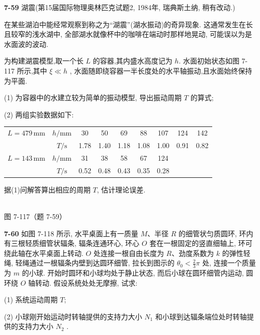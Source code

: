 \newpage

\textbf{7-59} 湖震(第15届国际物理奥林匹克试题2, 1984年, 瑞典斯土纳, 稍有改动.)

在某些湖泊中能经常观察到称之为“湖震”(湖水振动)的奇异现象. 这通常发生在长且较窄的浅水湖中, 全部湖水就像杯中的咖啡在端动时那样地晃动, 可能误以为是水面波的波动.

为构建湖震模型,取一个长 $L$ 的容器,其内盛水高度记为 $h$. 水面初始状态如图 7-117 所示,其中 $\xi \ll h$ , 水面随即绕容器一半长度处的水平轴振动,且水面始终保持为平面.

(1) 为容器中的水建立较为简单的振动模型, 导出振动周期 $T$ 的算式;

(2) 两组实验数据如下:

\begin{center}
\begin{tabular}{c|cccccccc}
\hline
$L=479\,\mathrm{mm}$ & $h/\text{mm}$ & 30 & 50 & 69 & 88 & 107 & 124 & 142\\
 & $T/\text{s}$ & 1.78 & 1.40 & 1.18 & 1.08 & 1.00 & 0.91 & 0.82\\
\hline
$L=143\,\mathrm{mm}$ & $h/\text{mm}$ & 31 & 38 & 58 & 67 & 124 & & \\
 & $T/\text{s}$ & 0.52 & 0.48 & 0.43 & 0.35 & 0.28 & & \\
\hline
\end{tabular}
\end{center}

据(1)问解答算出相应的周期 $T$, 估计理论误差.

\begin{center}
\resizebox{0.50\textwidth}{!}{}\\[4pt]
{\small 图 7-117（题 7-59）}
\end{center}

\newpage

\textbf{7-60} 如图 7-118 所示, 水平桌面上有一质量 $M$、半径 $R$ 的细管状匀质圆环, 环内有三根轻质细管状辐条, 辐条连通环心, 环心 $O$ 套在一根固定的竖直细轴上, 环可绕此轴在水平桌面上转动. $O$ 处连接一根自由长度为 $R$、劲度系数为 $k$ 的弹性轻绳, 轻绳通过一根辐条内壁到达圆环细管, 拉长到图示的 $\theta_{0}<\frac{2}{3}\pi$ 处, 连接一个质量为 $m$ 的小球. 开始时圆环和小球均处于静止状态, 而后小球在圆环细管内运动, 圆环绕 $O$ 轴转动. 假设系统处处无摩擦, 试求:

(1) 系统运动周期 $T$;

(2) 小球刚开始运动时转轴提供的支持力大小 $N_{1}$ 和小球到达辐条端位处时转轴提供的支持力大小 $N_{2}$ .

